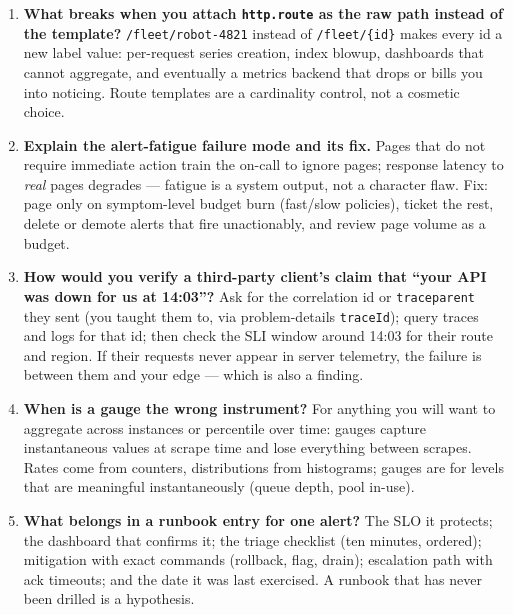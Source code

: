 \begin{enumerate}[label=\textbf{Q\arabic*.}, leftmargin=1.6cm, start=21]
        histogram at the knee rather than from a wish, and express the SLO
        as a threshold ratio (``99\% of interactive requests under
        300\,ms''). If one route genuinely has two populations, one SLI
        will lie to one of them.
  \item \textbf{What breaks when you attach \texttt{http.route} as the raw
        path instead of the template?}
        \texttt{/fleet/robot-4821} instead of \texttt{/fleet/\{id\}} makes
        every id a new label value: per-request series creation, index
        blowup, dashboards that cannot aggregate, and eventually a metrics
        backend that drops or bills you into noticing. Route templates are
        a cardinality control, not a cosmetic choice.
  \item \textbf{Explain the alert-fatigue failure mode and its fix.}
        Pages that do not require immediate action train the on-call to
        ignore pages; response latency to \emph{real} pages degrades ---
        fatigue is a system output, not a character flaw. Fix: page only on
        symptom-level budget burn (fast/slow policies), ticket the rest,
        delete or demote alerts that fire unactionably, and review page
        volume as a budget.
  \item \textbf{How would you verify a third-party client's claim that
        ``your API was down for us at 14:03''?}
        Ask for the correlation id or \texttt{traceparent} they sent (you
        taught them to, via problem-details \texttt{traceId}); query traces
        and logs for that id; then check the SLI window around 14:03 for
        their route and region. If their requests never appear in server
        telemetry, the failure is between them and your edge --- which is
        also a finding.
  \item \textbf{When is a gauge the wrong instrument?}
        For anything you will want to aggregate across instances or
        percentile over time: gauges capture instantaneous values at scrape
        time and lose everything between scrapes. Rates come from counters,
        distributions from histograms; gauges are for levels that are
        meaningful instantaneously (queue depth, pool in-use).
  \item \textbf{What belongs in a runbook entry for one alert?}
        The SLO it protects; the dashboard that confirms it; the triage
        checklist (ten minutes, ordered); mitigation with exact commands
        (rollback, flag, drain); escalation path with ack timeouts; and the
        date it was last exercised. A runbook that has never been drilled
        is a hypothesis.
\end{enumerate}


